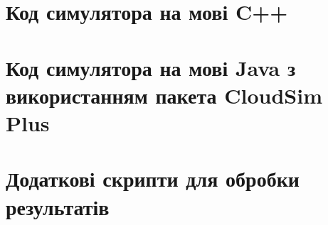 
\begin{appendices}
	
	
	\section*{Код симулятора на мові C++}
		
	
	
	
	
	
	
	
	
	\section*{Код симулятора на мові Java з використанням пакета CloudSim Plus}
	
	
	
	
	
	
	
	\section*{Додаткові скрипти для обробки результатів}
	
	
	
	
	
	
	
	

\end{appendices}